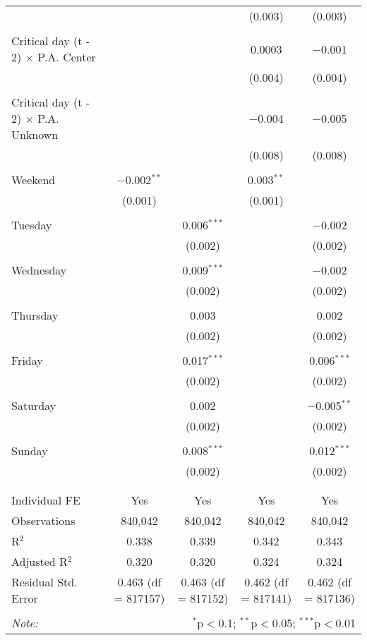 \documentclass[
]{article}
\begin{document}
\begin{table}[!htbp]
{\begin{tabular}{@{\extracolsep{5pt}}lcccc}
  &  &  & (0.003) & (0.003) \\ 
  & & & & \\ 
 Critical day (t - 2) $\times$ P.A. Center &  &  & 0.0003 & $-$0.001 \\ 
  &  &  & (0.004) & (0.004) \\ 
  & & & & \\ 
 Critical day (t - 2) $\times$ P.A. Unknown &  &  & $-$0.004 & $-$0.005 \\ 
  &  &  & (0.008) & (0.008) \\ 
  & & & & \\ 
 Weekend & $-$0.002$^{**}$ &  & 0.003$^{**}$ &  \\ 
  & (0.001) &  & (0.001) &  \\ 
  & & & & \\ 
 Tuesday &  & 0.006$^{***}$ &  & $-$0.002 \\ 
  &  & (0.002) &  & (0.002) \\ 
  & & & & \\ 
 Wednesday &  & 0.009$^{***}$ &  & $-$0.002 \\ 
  &  & (0.002) &  & (0.002) \\ 
  & & & & \\ 
 Thursday &  & 0.003 &  & 0.002 \\ 
  &  & (0.002) &  & (0.002) \\ 
  & & & & \\ 
 Friday &  & 0.017$^{***}$ &  & 0.006$^{***}$ \\ 
  &  & (0.002) &  & (0.002) \\ 
  & & & & \\ 
 Saturday &  & 0.002 &  & $-$0.005$^{**}$ \\ 
  &  & (0.002) &  & (0.002) \\ 
  & & & & \\ 
 Sunday &  & 0.008$^{***}$ &  & 0.012$^{***}$ \\ 
  &  & (0.002) &  & (0.002) \\ 
  & & & & \\ 
\hline \\[-1.8ex] 
Individual FE & Yes & Yes & Yes & Yes \\ 
Observations & 840,042 & 840,042 & 840,042 & 840,042 \\ 
R$^{2}$ & 0.338 & 0.339 & 0.342 & 0.343 \\ 
Adjusted R$^{2}$ & 0.320 & 0.320 & 0.324 & 0.324 \\ 
Residual Std. Error & 0.463 (df = 817157) & 0.463 (df = 817152) & 0.462 (df = 817141) & 0.462 (df = 817136) \\ 
\hline 
\hline \\[-1.8ex] 
\textit{Note:}  & \multicolumn{4}{r}{$^{*}$p$<$0.1; $^{**}$p$<$0.05; $^{***}$p$<$0.01} \\ 
\end{tabular}
} 
\end{table} 
\newpage
\end{document}
